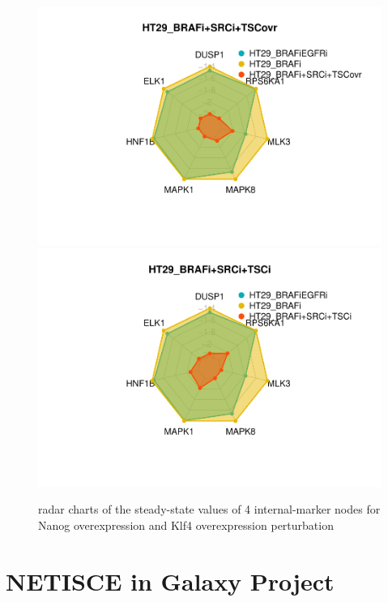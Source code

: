 \documentclass[
]{book}
\begin{document}
\begin{figure}
\includegraphics[width=0.5\linewidth]{_main_files/figure-latex/crc-chartsmapk-1} \includegraphics[width=0.5\linewidth]{_main_files/figure-latex/crc-chartsmapk-2} \caption{radar charts of the steady-state values of 4 internal-marker nodes for Nanog overexpression and Klf4 overexpression perturbation}\label{fig:crc-chartsmapk}
\end{figure}

\hypertarget{netisce-in-galaxy-project}{%
\chapter{NETISCE in Galaxy Project}\label{netisce-in-galaxy-project}}

  
\end{document}
